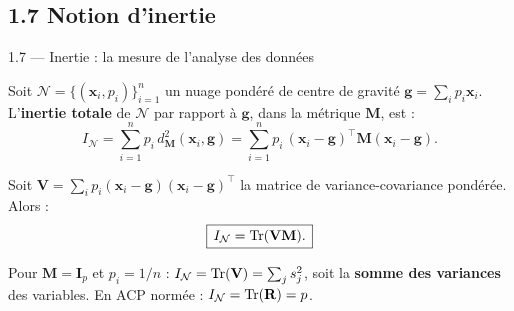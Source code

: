 \subsection{1.7 Notion d'inertie}
\begin{frame}{1.7 — Inertie : la mesure de l'analyse des données}
\begin{definition}
Soit $\mathcal{N} = \{(\mathbf{x}_i, p_i)\}_{i=1}^n$ un nuage pondéré de centre de gravité
$\mathbf{g} = \sum_i p_i \mathbf{x}_i$. L'\textbf{inertie totale} de $\mathcal{N}$ par rapport à
$\mathbf{g}$, dans la métrique $\mathbf{M}$, est :
\[
I_{\mathcal{N}} = \sum_{i=1}^n p_i \, d_{\mathbf{M}}^2(\mathbf{x}_i, \mathbf{g})
= \sum_{i=1}^n p_i \, (\mathbf{x}_i - \mathbf{g})^\top \mathbf{M} (\mathbf{x}_i - \mathbf{g}).
\]
\end{definition}

\begin{prop}
Soit $\mathbf{V} = \sum_i p_i (\mathbf{x}_i - \mathbf{g})(\mathbf{x}_i - \mathbf{g})^\top$
la matrice de variance-covariance pondérée. Alors :
\[
\boxed{\,I_{\mathcal{N}} = \operatorname{Tr}(\mathbf{V} \mathbf{M}).\,}
\]
\end{prop}

\begin{rema}
Pour $\mathbf{M} = \mathbf{I}_p$ et $p_i = 1/n$ : $I_{\mathcal{N}} = \operatorname{Tr}(\mathbf{V}) = \sum_j s_j^2$,
soit la \textbf{somme des variances} des variables. En ACP normée :
$I_{\mathcal{N}} = \operatorname{Tr}(\mathbf{R}) = p$.
\end{rema}
\end{frame}

